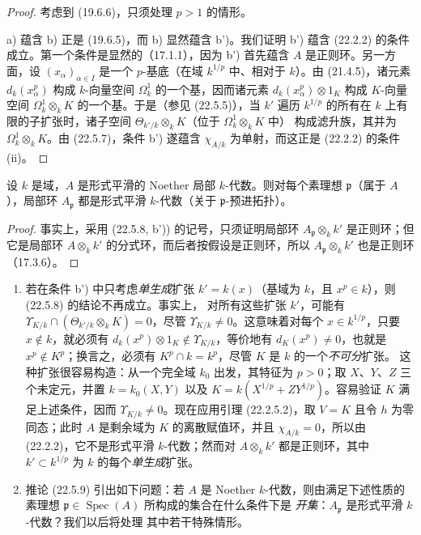 \begin{proof}
考虑到 (19.6.6)，只须处理 $p>1$ 的情形。

a) 蕴含 b) 正是 (19.6.5)，而 b) 显然蕴含 b')。我们证明 b') 蕴含
(22.2.2) 的条件成立。第一个条件是显然的（17.1.1），因为 b') 首先蕴含
$A$ 是正则环。另一方面，设 $(x_\alpha)_{\alpha\in I}$ 是一个
$p$-基底（在域 $k^{1/p}$ 中、相对于 $k$）。由 (21.4.5)，诸元素
$d_k(x_\alpha^p)$ 构成 $k$-向量空间 $\Omega^1_k$ 的一个基，因而诸元素
$d_k(x_\alpha^p)\otimes1_K$ 构成 $K$-向量空间
$\Omega^1_k\otimes_kK$ 的一个基。于是（参见 (22.5.5)），当 $k'$ 遍历
$k^{1/p}$ 的所有在 $k$ 上有限的子扩张时，诸子空间
$\Theta_{k'/k}\otimes_kK$（位于 $\Omega^1_k\otimes_kK$ 中）
构成滤升族，其并为
$\Omega^1_k\otimes_kK$。由 (22.5.7)，条件 b') 遂蕴含
$\chi_{A/k}$ 为单射，而这正是 (22.2.2) 的条件 (ii)。
\end{proof}

\begin{corollary}[22.5.9]
\label{0.22.5.9-fr}
设 $k$ 是域，$A$ 是形式平滑的 Noether 局部 $k$-代数。则对每个素理想
$\mathfrak p$（属于 $A$），局部环 $A_{\mathfrak p}$ 都是形式平滑
$k$-代数（关于 $\mathfrak p$-预进拓扑）。
\end{corollary}

\begin{proof}
事实上，采用 (22.5.8, b')) 的记号，只须证明局部环
$A_{\mathfrak p}\otimes_kk'$ 是正则环；但它是局部环
$A\otimes_kk'$ 的分式环，而后者按假设是正则环，所以
$A_{\mathfrak p}\otimes_kk'$ 也是正则环（17.3.6）。
\end{proof}

\begin{remark}[22.5.10]
\label{0.22.5.10-fr}
\begin{enumerate}
  \item[\rm(i)] 若在条件 b') 中只考虑\emph{单生成}扩张
  $k'=k(x)$（基域为 $k$，且 $x^p\in k$），则 (22.5.8) 的结论不再成立。事实上，
  对所有这些扩张 $k'$，可能有
  $\Upsilon_{K/k}\cap(\Theta_{k'/k}\otimes_kK)=0$，尽管
  $\Upsilon_{K/k}\neq0$。这意味着对每个 $x\in k^{1/p}$，只要
  $x\notin k$，就必须有
  $d_k(x^p)\otimes1_K\notin\Upsilon_{K/k}$，等价地有
  $d_K(x^p)\neq0$，也就是 $x^p\notin K^p$；换言之，必须有
  $K^p\cap k=k^p$，尽管 $K$ 是 $k$ 的一个\emph{不可分}扩张。
  这种扩张很容易构造：从一个完全域 $k_0$ 出发，其特征为 $p>0$；取
  $X$、$Y$、$Z$ 三个未定元，并置 $k=k_0(X,Y)$ 以及
  $K=k(X^{1/p}+ZY^{1/p})$。容易验证 $K$ 满足上述条件，因而
  $\Upsilon_{K/k}\neq0$。现在应用引理 (22.2.5.2)，取 $V=K$ 且令
  $h$ 为零同态；此时 $A$ 是剩余域为 $K$ 的离散赋值环，并且
  $\chi_{A/k}=0$，所以由 (22.2.2)，它不是形式平滑 $k$-代数；然而对
  $A\otimes_kk'$ 都是正则环，其中 $k'\subset k^{1/p}$ 为
  $k$ 的每个\emph{单生成}扩张。


  \item[\rm(ii)] 推论 (22.5.9) 引出如下问题：若 $A$ 是 Noether
  $k$-代数，则由满足下述性质的素理想
  $\mathfrak p\in\operatorname{Spec}(A)$ 所构成的集合在什么条件下是
  \emph{开集}：$A_{\mathfrak p}$ 是形式平滑 $k$-代数？我们以后将处理
  其中若干特殊情形。
\end{enumerate}
\end{remark}

